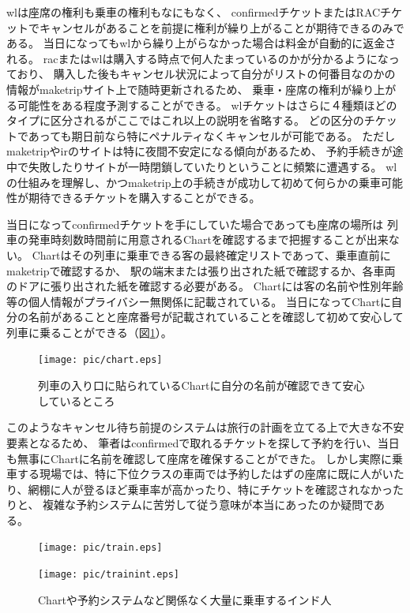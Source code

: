 \acrshort{wl}は座席の権利も乗車の権利もなにもなく、
confirmedチケットまたはRACチケットでキャンセルがあることを前提に権利が繰り上がることが期待できるのみである。
当日になっても\acrshort{wl}から繰り上がらなかった場合は料金が自動的に返金される。
\acrshort{rac}または\acrshort{wl}は購入する時点で何人たまっているのかが分かるようになっており、
購入した後もキャンセル状況によって自分がリストの何番目なのかの情報が\acrshort{maketrip}サイト上で随時更新されるため、
乗車・座席の権利が繰り上がる可能性をある程度予測することができる。
\acrshort{wl}チケットはさらに４種類ほどのタイプに区分されるがここではこれ以上の説明を省略する。
どの区分のチケットであっても期日前なら特にペナルティなくキャンセルが可能である。
ただし\acrshort{maketrip}や\acrlong{ir}のサイトは特に夜間不安定になる傾向があるため、
予約手続きが途中で失敗したりサイトが一時閉鎖していたりということに頻繁に遭遇する。
\acrshort{wl}の仕組みを理解し、かつ\acrshort{maketrip}上の手続きが成功して初めて何らかの乗車可能性が期待できるチケットを購入することができる。
\par
当日になってconfirmedチケットを手にしていた場合であっても座席の場所は
列車の発車時刻数時間前に用意されるChartを確認するまで把握することが出来ない。
Chartはその列車に乗車できる客の最終確定リストであって、乗車直前に\acrshort{maketrip}で確認するか、
駅の端末または張り出された紙で確認するか、各車両のドアに張り出された紙を確認する必要がある。
Chartには客の名前や性別年齢等の個人情報がプライバシー無関係に記載されている。
当日になってChartに自分の名前があることと座席番号が記載されていることを確認して初めて安心して列車に乗ることができる（図\ref{chart}）。
\begin{figure}[ht]
  \centering
  \texttt{[image: pic/chart.eps]}
  \caption{列車の入り口に貼られているChartに自分の名前が確認できて安心しているところ}
  \label{chart}
\end{figure}
\par
このようなキャンセル待ち前提のシステムは旅行の計画を立てる上で大きな不安要素となるため、
筆者はconfirmedで取れるチケットを探して予約を行い、当日も無事にChartに名前を確認して座席を確保することができた。
しかし実際に乗車する現場では、特に下位クラスの車両では予約したはずの座席に既に人がいたり、網棚に人が登るほど乗車率が高かったり、特にチケットを確認されなかったりと、
複雑な予約システムに苦労して従う意味が本当にあったのか疑問である。
\begin{figure}[ht]
  \begin{minipage}{0.5\hsize}
  \begin{center}
    \texttt{[image: pic/train.eps]}
  \end{center}
  \end{minipage}
  \begin{minipage}{0.5\hsize}
  \begin{center}
    \texttt{[image: pic/trainint.eps]}
  \end{center}
  \end{minipage}
  \caption{Chartや予約システムなど関係なく大量に乗車するインド人}
  \label{railway}
\end{figure}
